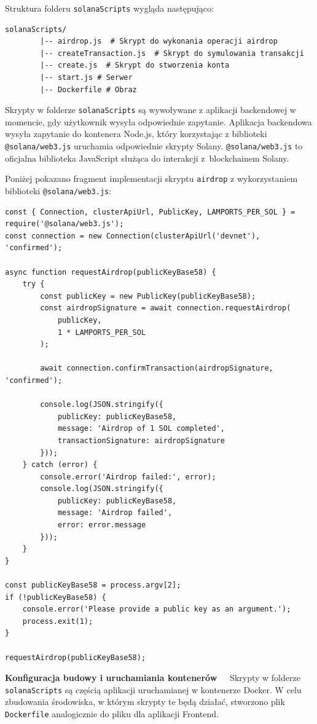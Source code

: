 Struktura folderu \texttt{solanaScripts} wygląda następująco:
\begin{lstlisting}[basicstyle=\footnotesize\ttfamily,tabsize=4]
solanaScripts/
		|-- airdrop.js  # Skrypt do wykonania operacji airdrop
		|-- createTransaction.js  # Skrypt do symulowania transakcji
		|-- create.js  # Skrypt do stworzenia konta
		|-- start.js # Serwer
		|-- Dockerfile # Obraz 
\end{lstlisting}

Skrypty w folderze \texttt{solanaScripts} są wywoływane z aplikacji backendowej w momencie, gdy użytkownik wysyła odpowiednie zapytanie. Aplikacja backendowa wysyła zapytanie do kontenera Node.js, który korzystając z biblioteki \texttt{@solana/web3.js} uruchamia odpowiednie skrypty Solany. \texttt{@solana/web3.js} to oficjalna biblioteka JavaScript służąca do interakcji z~blockchainem Solany.  

Poniżej pokazano fragment implementacji skryptu \texttt{airdrop} z wykorzystaniem biblioteki \texttt{@solana/web3.js}:
\begin{lstlisting}[style=JavaScriptStyle]
const { Connection, clusterApiUrl, PublicKey, LAMPORTS_PER_SOL } = require('@solana/web3.js');
const connection = new Connection(clusterApiUrl('devnet'), 'confirmed');

async function requestAirdrop(publicKeyBase58) {
    try {
        const publicKey = new PublicKey(publicKeyBase58);
        const airdropSignature = await connection.requestAirdrop(
            publicKey,
            1 * LAMPORTS_PER_SOL
        );

        await connection.confirmTransaction(airdropSignature, 'confirmed');

        console.log(JSON.stringify({
            publicKey: publicKeyBase58,
            message: 'Airdrop of 1 SOL completed',
            transactionSignature: airdropSignature
        }));
    } catch (error) {
        console.error('Airdrop failed:', error);
        console.log(JSON.stringify({
            publicKey: publicKeyBase58,
            message: 'Airdrop failed',
            error: error.message
        }));
    }
}

const publicKeyBase58 = process.argv[2];
if (!publicKeyBase58) {
    console.error('Please provide a public key as an argument.');
    process.exit(1);
}

requestAirdrop(publicKeyBase58);
\end{lstlisting}


\noindent \textbf{Konfiguracja budowy i uruchamiania kontenerów~~}
Skrypty w folderze \texttt{solanaScripts} są częścią aplikacji uruchamianej w kontenerze Docker. W celu zbudowania środowiska, w którym skrypty te będą działać, stworzono plik \texttt{Dockerfile} analogicznie do pliku dla aplikacji Frontend. 

